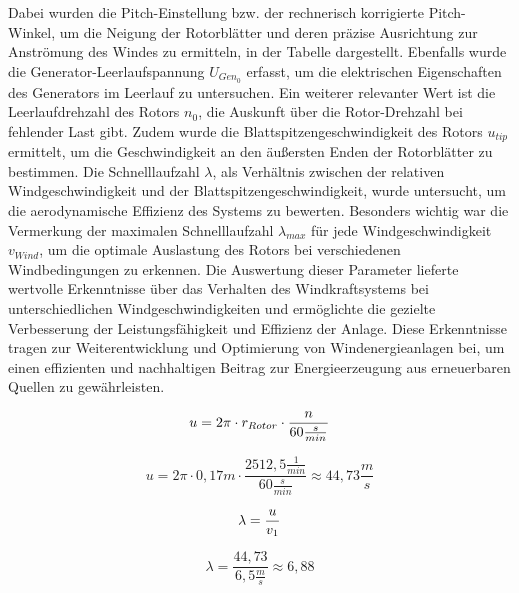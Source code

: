      Dabei wurden die Pitch-Einstellung bzw. der rechnerisch korrigierte Pitch-Winkel, um die Neigung der Rotorblätter und deren 
     präzise Ausrichtung zur Anströmung des Windes zu ermitteln, in der Tabelle dargestellt. Ebenfalls wurde die Generator-Leerlaufspannung $U_{Gen_0}$ erfasst, 
     um die elektrischen Eigenschaften des Generators im Leerlauf zu untersuchen. Ein weiterer relevanter Wert ist die Leerlaufdrehzahl des Rotors $n_0$, 
     die Auskunft über die Rotor-Drehzahl bei fehlender Last gibt. Zudem wurde die Blattspitzengeschwindigkeit des Rotors $u_{tip}$ ermittelt, um die Geschwindigkeit an den äußersten Enden der Rotorblätter zu bestimmen. 
     Die Schnelllaufzahl $\lambda$, als Verhältnis zwischen der relativen Windgeschwindigkeit und der Blattspitzengeschwindigkeit, wurde untersucht, um die aerodynamische Effizienz des Systems zu bewerten. Besonders wichtig war die Vermerkung der maximalen
    Schnelllaufzahl $\lambda_{max}$ für jede Windgeschwindigkeit $v_{Wind}$, um die optimale Auslastung des Rotors bei verschiedenen Windbedingungen zu erkennen. Die Auswertung dieser Parameter lieferte
    wertvolle Erkenntnisse über das Verhalten des Windkraftsystems bei unterschiedlichen Windgeschwindigkeiten und ermöglichte die gezielte Verbesserung der Leistungsfähigkeit und Effizienz der Anlage. Diese Erkenntnisse tragen zur Weiterentwicklung und 
    Optimierung von Windenergieanlagen bei,
     um einen effizienten und nachhaltigen 
     Beitrag zur Energieerzeugung aus erneuerbaren Quellen zu gewährleisten.

\begin{equation}
    \centering
    u = 2 \pi \cdot r_{Rotor} \cdot \frac{n}{60 \frac{s}{min}}
    \label{eq:230615_Umfangsgeschwindigkeit}
\end{equation}

$$    u = 2 \pi \cdot 0,17m \cdot \frac{2512,5 \frac{1}{min}}{60 \frac{s}{min}}\approx 44,73\frac{m}{s} $$

\begin{equation}
    \centering
    \lambda = \frac{u}{v_1}
    \label{eq:230615_Schnelllaufzahl}
\end{equation}

$$\lambda = \frac{44,73}{6,5 \frac{m}{s}}\approx 6,88$$

